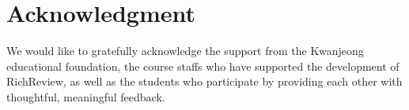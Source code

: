 \documentclass{sigchi}
\begin{document}
\section{Acknowledgment} 
We would like to gratefully acknowledge the support from the Kwanjeong educational foundation, the course staffs who have supported the development of RichReview, as well as the students who participate by providing each other with thoughtful, meaningful feedback.



\end{document}
